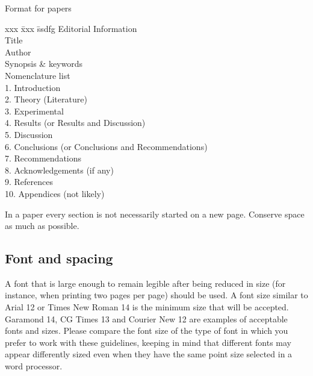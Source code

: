 \documentclass[a5paper, 10pt]{article}
\begin{document}
\begin{table}[htbp]
\centering
\caption{Format for papers}
\label{tab:paperformat}

\begin{boxedminipage}[t]{0.7\textwidth}
  \begin{spacing}{1.8}
    \begin{tabbing}
      xxx \= xxx \= ssdfg \kill
      Editorial Information                                    \\
          \> Title                                             \\
          \> Author                                            \\         
          \> Synopsis \& keywords                              \\
          \> Nomenclature list                                 \\
      1.  \> Introduction                                      \\
      2.  \> Theory  (Literature)                              \\
      3.  \> Experimental                                      \\
      4.  \> Results  (or Results and Discussion)              \\
      5.  \> Discussion                                        \\
      6.  \> Conclusions  (or Conclusions and Recommendations) \\
      7.  \> Recommendations                                   \\
      8.  \> Acknowledgements  (if any)                        \\
      9.  \> References                                        \\
      10. \> Appendices  (not likely)
    \end{tabbing}
  \end{spacing}
\end{boxedminipage}

In a paper every section is not necessarily started on a new page.
Conserve space as much as possible.
\end{table}

\subsection{Font and spacing}
A font that is large enough to remain legible after being reduced in
size (for instance, when printing two pages per page) should be used.
A font size similar to Arial 12 or Times New Roman 14 is the minimum
size that will be accepted.  Garamond 14, CG Times 13 and Courier New
12 are examples of acceptable fonts and sizes.  Please compare the
font size of the type of font in which you prefer to work with these
guidelines, keeping in mind that different fonts may appear
differently sized even when they have the same point size selected in
a word processor.
\end{document}
